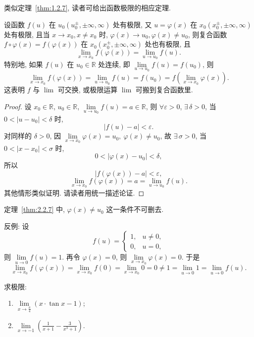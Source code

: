 \begin{remark}\label{rem:2.2.2}
类似定理~\ref{thm:1.2.7}, 读者可给出函数极限的相应定理.
\end{remark}

\begin{theorem}[复合函数的极限]\label{thm:2.2.7}
设函数 $f(u)$ 在 $u_{0}(u_{0}^{\pm}, \pm\infty, \infty)$ 处有极限, 又 $u=\varphi(x)$ 在 $x_{0}(x_{0}^{\pm}, \pm\infty, \infty)$ 处有极限, 且当 $x \to x_{0}, x \neq x_{0}$ 时, $\varphi(x) \to u_{0}, \varphi(x) \neq u_{0}$, 则复合函数 $f\circ\varphi(x) = f(\varphi(x))$ 在 $x_{0}(x_{0}^{\pm}, \pm\infty, \infty)$ 处也有极限, 且
\[
\lim_{x\to x_{0}}f(\varphi(x))=\lim_{u\to u_{0}}f(u).
\]
特别地, 如果 $f(u)$ 在 $u_{0} \in \mathbb{R}$ 处连续, 即 $\lim\limits_{u \to u_0} f(u) = f(u_{0})$, 则
\[
\lim_{x\to x_{0}}f(\varphi(x))=\lim_{u\to u_{0}}f(u)=f(u_{0})=f\left(\lim_{x\to x_{0}}\varphi(x)\right).
\]
这表明 $f$ 与 $\lim$ 可交换, 或极限运算 $\lim$ 可搬到复合函数里.
\end{theorem}

\begin{proof}
设 $x_{0} \in \mathbb{R}$, $u_{0} \in \mathbb{R}$, $\lim\limits_{u \to u_{0}} f(u) = a \in \mathbb{R}$, 则 $\forall \varepsilon > 0$, $\exists\,\delta > 0$, 当 $0 < |u - u_{0}| < \delta$ 时,
\[
|f(u)-a|<\varepsilon.
\]
对同样的 $\delta>0$, 因 $\lim\limits_{x\to x_0}\varphi(x)=u_0,\ \varphi(x)\neq u_0$, 故 $\exists\,\sigma>0$, 当 $0<|x-x_0|<\sigma$ 时,
\[
0<|\varphi(x)-u_{0}|<\delta,
\]
所以
\[
|f(\varphi(x))-a|<\varepsilon,
\]
\[
\lim_{x\to x_{0}}f(\varphi(x))=a=\lim_{u\to u_{0}}f(u).
\]
其他情形类似证明. 请读者用统一描述论证.
\end{proof}

\begin{remark}\label{rem:2.2.3}
定理~\ref{thm:2.2.7} 中, $\varphi(x)\neq u_{0}$ 这一条件不可删去.

反例: 设
\[
f(u)=\begin{cases}
1, & u\neq 0, \\
0, & u=0,
\end{cases}
\]
则 $\lim\limits_{u\to 0}f(u)=1$. 再令 $\varphi(x)=0$, 则 $\lim\limits_{x\to x_0}\varphi(x)=0$. 于是
\[
\lim_{x\to x_{0}}f(\varphi(x))=\lim_{x\to x_{0}}f(0)=\lim_{x\to x_{0}}0=0 \neq 1=\lim_{u\to 0}1=\lim_{u\to 0}f(u).
\]
\end{remark}

\begin{example}\label{ex:2.2.1}
求极限:
\begin{enumerate}[label=(\arabic*)]
  \item $\lim\limits_{x \to \frac{\pi}{4}} (x \cdot \tan x - 1)$;
  \item $\lim\limits_{x\to -1}\left(\frac{1}{x+1}-\frac{3}{x^{3}+1}\right)$.
\end{enumerate}
\end{example}

